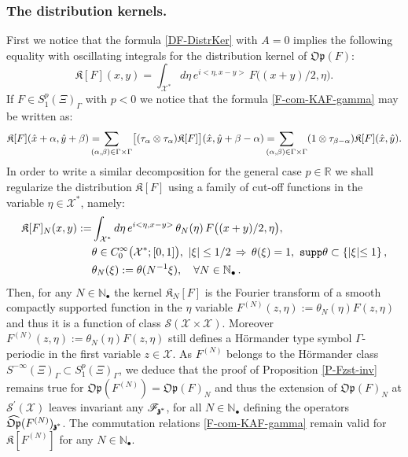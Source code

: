 \documentclass[12pt]{article}
\theoremstyle{definition}
\def\R{\mathbb{R}}
\def\Op{\mathfrak{Op}}
\def\X{\mathcal X}
\def\supp{\mathop{\rm supp} \nolimits}
\def\bz{\mathfrak{z}\hspace*{-4pt}\mathfrak{z}}
\def\Nb{\mathbb{N}_{\bullet}}
\def\beq{\begin{equation}}
\def\eeq{\end{equation}}
\def\supp{\text{\tt supp}}
\numberwithin{equation}{section}
\begin{document}
\subsubsection{The distribution kernels.}

First we notice that the formula \eqref{DF-DistrKer} with $A=0$ implies the following equality with oscillating integrals for the distribution kernel of $\Op(F)$:
\beq\label{F-II-11}
\mathfrak{K}[F](x,y)=\int_{\X^*}d\eta\,e^{i<\eta,x-y>}\,F\big((x+y)/2,\eta\big).
\eeq
If $F\in{S}^p_1(\Xi)_{\Gamma}$ with $p<0$ we notice that the formula \eqref{F-com-KAF-gamma} may be written as:
\beq\label{F-II-1}
\mathfrak{K}[F](\hat{x}+\alpha,\hat{y}+\beta)=\hspace*{-0.4cm}\underset{(\alpha,\beta)\in\Gamma\times\Gamma}{\sum}\big[(\tau_{\alpha}\otimes\tau_{\alpha})\mathfrak{K}[F]\big](\hat{x},\hat{y}+\beta-\alpha)=\hspace*{-0.4cm}\underset{(\alpha,\beta)\in\Gamma\times\Gamma}{\sum}(1\otimes\tau_{\beta-\alpha})\mathfrak{K}[F](\hat{x},\hat{y}).
\eeq
In order to write a similar decomposition for the general case $p\in\R$ we shall regularize the distribution $\mathfrak{K}[F]$ using a family of cut-off functions in the variable $\eta\in\X^*$, namely:
\beq\begin{split}
	\mathfrak{K}[F]_N(x,y):=&\int_{\X^*}d\eta\,e^{i<\eta,x-y>}\,\theta_N(\eta)\,F\big((x+y)/2,\eta\big),\\
	&\theta\in{C}^\infty_0\big(\X^*;[0,1]\big),\ |\xi|\leq1/2\,\Rightarrow\,\theta(\xi)=1,\ \supp\theta\subset\{|\xi|{ \leq 1}\}\,,\\
	&\theta_N(\xi):=\theta(N^{-1}\xi),\quad\forall{N}\in\Nb\,.
\end{split}\eeq
Then, for any ${N}\in\Nb$ the kernel $\mathfrak{K}_N[F]$ is the Fourier transform of a smooth compactly supported function { in the $\eta$ variable} $F^{(N)}(z,\eta):=\theta_N(\eta)F(z,\eta)$ and thus it is a function of class $\mathscr{S}(\X\times\X)$. 
Moreover $F^{(N)}(z,\eta):=\theta_N(\eta)F(z,\eta)$ still defines a H\"{o}rmander type symbol $\Gamma$-periodic in the first variable $z\in\X$.
As $F^{(N)}$ belongs to the H\"{o}rmander class $S^{-\infty}(\Xi)_{\Gamma}\subset{S}^p_1(\Xi)_{\Gamma}$, we deduce that the proof of Proposition \ref{P-Fzst-inv} remains true for $\Op(F^{(N)})=\Op(F)_N$ and thus the extension of $\Op(F)_N$ at $\mathscr{S}^\prime(\X)$ leaves invariant any $\mathscr{F}_{\bz^*}$, for all $N\in\Nb$ defining the operators $\widehat{\Op}(F^{(N)})_{\bz^*}$. The commutation relations \eqref{F-com-KAF-gamma} remain valid for $\mathfrak{K}[F^{(N)}]$ for any $N\in\Nb$.
\end{document}
